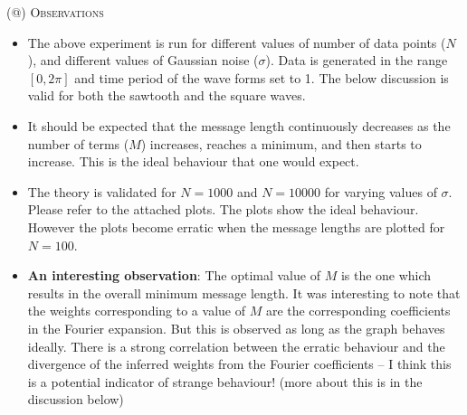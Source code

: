 \documentclass[a4paper,12pt]{article}
\makeatletter
\newcommand*{\rom}[1]{\expandafter\@slowromancap\romannumeral #1@}
\makeatother
\begin{document}
\noindent (\rom{4}) \textsc{Observations} 
\begin{itemize}
 \item The above experiment is run for different values of number of data points ($N$), and different values of Gaussian noise ($\sigma$). Data is generated in the range $[0,2\pi]$ and time period of the wave forms set to 1. The below discussion is valid for both the sawtooth and the square waves.

 \item It should be expected that the message length continuously decreases as the number of terms ($M$) increases, reaches a minimum, and then starts to increase. This is the ideal behaviour that one would expect. 
 
 \item The theory is validated for $N=1000$ and $N=10000$ for varying values of $\sigma$. Please refer to the attached plots. The plots show the ideal behaviour. However the plots become erratic when the message lengths are plotted for $N=100$.
 
 \item \textbf{An interesting observation}: The optimal value of $M$ is the one which results in the overall minimum message length. It was interesting to note that the weights corresponding to a value of $M$ are the corresponding coefficients in the Fourier expansion. But this is observed as long as the graph behaves ideally. There is a strong correlation between the erratic behaviour and the divergence of the inferred weights from the Fourier coefficients -- I think this is a potential indicator of strange behaviour! (more about this is in the discussion below)
\end{itemize} 
\end{document}
